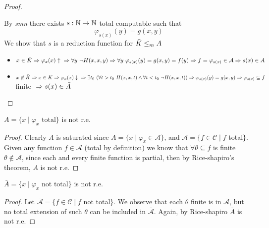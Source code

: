 \begin{theorem}
\begin{proof}
\begin{enumerate}
    By \emph{smn} there exists $ s:\mathbb{N}\rightarrow\mathbb{N} $ total computable such that
    \[\varphi_{s(x)}(y) = g(x,y) \]
    We show that $s$ is a reduction function for $ \bar{K}\leq_m A $
    \begin{itemize}
    \item $ x\in\bar{K}\\ 
      \Rightarrow\varphi_{x}(x)\uparrow \\
      \Rightarrow\forall y\ \lnot H(x,x,y)\\ 
      \Rightarrow \forall y\ \varphi_{s(x)}(y) = g(x,y) = f(y)\\ 
      \Rightarrow f = \varphi_{s(x)} \in \mathcal{A} \\
      \Rightarrow s(x)\in A$
    \item
      $ x\not\in\bar{K}\\ 
      \Rightarrow x\in K\\ 
      \Rightarrow \varphi_x(x)\downarrow\\ 
      \Rightarrow \exists t_0 \ (\forall
      t>t_0\ H(x,x,t) \wedge \forall t<t_0 \ \lnot H(x,x,t))\\
      \Rightarrow\varphi_{s(x)}(y) = g(x,y)\\ 
      \Rightarrow \varphi_{s(x)}\subseteq f$ finite
      $\\ \Rightarrow s(x) \in \bar{A} $
    \end{itemize}
  \end{enumerate}
\end{proof}
\end{theorem}

\begin{example}\label{exe:rice1}
  $A = \{ x \mid \varphi_x \mbox{ total}\}$ is not r.e.

  \begin{proof}
    Clearly $A$ is saturated since $A = \{x \mid \varphi_x \in
    \mathcal{A}\}$, and $\mathcal{A} = \{f \in \mathcal{C} \mid f $ total$\}$. 
    Given any function $f \in \mathcal{A}$ (total by
    definition) we know that $\forall \theta \subseteq f$
    is finite $\theta \notin \mathcal{A}$, since each and every finite
    function is partial, then by Rice-shapiro's theorem, $A$ is
    not r.e.
  \end{proof}
\end{example}

\begin{example}\label{exe:rice2}
  $\bar{A} = \{x \mid \varphi_x $ not total$\}$ is not r.e.

  \begin{proof}
    Let $\bar{\mathcal{A}} = \{f \in \mathcal{C} \mid f $ not total$\}$. We observe that each $\theta$ finite is in
    $\bar{\mathcal{A}}$, but no total extension of such $\theta$ can
    be included in $\bar{\mathcal{A}}$. Again, by Rice-shapiro
    $\bar{A}$ is not r.e.
  \end{proof}
\end{example}

